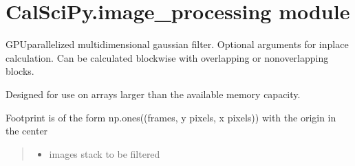 \documentclass[letterpaper,10pt,english]{sphinxmanual}
\begin{document}
\sphinxstepscope


\chapter{CalSciPy.image\_processing module}
\label{\detokenize{CalSciPy.image_processing:module-CalSciPy.image_processing}}\label{\detokenize{CalSciPy.image_processing:calscipy-image-processing-module}}\label{\detokenize{CalSciPy.image_processing::doc}}

\begin{fulllineitems}
\label{\detokenize{CalSciPy.image_processing:CalSciPy.image_processing.gaussian_filter}}
\pysigstartsignatures
{}
\pysigstopsignatures
\sphinxAtStartPar
GPU\sphinxhyphen{}parallelized multidimensional gaussian filter. Optional arguments for in\sphinxhyphen{}place calculation. Can be calculated
blockwise with overlapping or non\sphinxhyphen{}overlapping blocks.

\sphinxAtStartPar
Designed for use on arrays larger than the available memory capacity.

\sphinxAtStartPar
Footprint is of the form np.ones((frames, y pixels, x pixels)) with the origin in the center
\begin{quote}\begin{description}
\begin{itemize}
\item {} 
\sphinxAtStartPar
{} \textendash{} images stack to be filtered


\end{itemize}
\end{description}
\end{quote}
\end{fulllineitems}
\end{document}
